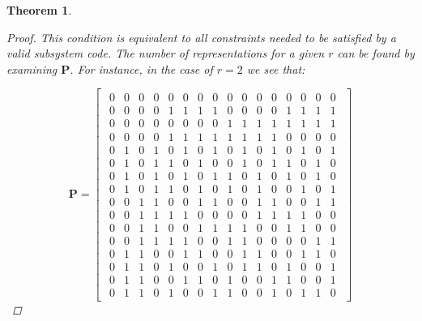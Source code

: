 \documentclass[conference]{IEEEtran}
\newtheorem{theorem}{Theorem}
\begin{document}
\begin{theorem}
\begin{proof}
   This condition is equivalent to all constraints needed to be satisfied by a valid subsystem code. The number of representations for a given $r$ can be found by examining $\boldsymbol{P}$. For instance, in the case of $r=2$ we see that:
       
  \begin{equation}\boldsymbol{P}=\begin{bmatrix}
  \begin{smallmatrix}
       0 & 0 & 0 & 0 & 0 & 0 & 0 & 0 & 0 & 0 & 0 & 0 & 0 & 0 & 0 & 0\\
       0 & 0 & 0 & 0 & 1 & 1 & 1 & 1 & 0 & 0 & 0 & 0 & 1 & 1 & 1 & 1\\
       0 & 0 & 0 & 0 & 0 & 0 & 0 & 0 & 1 & 1 & 1 & 1 & 1 & 1 & 1 & 1\\
       0 & 0 & 0 & 0 & 1 & 1 & 1 & 1 & 1 & 1 & 1 & 1 & 0 & 0 & 0 & 0\\
       0 & 1 & 0 & 1 & 0 & 1 & 0 & 1 & 0 & 1 & 0 & 1 & 0 & 1 & 0 & 1\\
       0 & 1 & 0 & 1 & 1 & 0 & 1 & 0 & 0 & 1 & 0 & 1 & 1 & 0 & 1 & 0\\
       0 & 1 & 0 & 1 & 0 & 1 & 0 & 1 & 1 & 0 & 1 & 0 & 1 & 0 & 1 & 0\\
       0 & 1 & 0 & 1 & 1 & 0 & 1 & 0 & 1 & 0 & 1 & 0 & 0 & 1 & 0 & 1\\
       0 & 0 & 1 & 1 & 0 & 0 & 1 & 1 & 0 & 0 & 1 & 1 & 0 & 0 & 1 & 1\\
       0 & 0 & 1 & 1 & 1 & 1 & 0 & 0 & 0 & 0 & 1 & 1 & 1 & 1 & 0 & 0\\
       0 & 0 & 1 & 1 & 0 & 0 & 1 & 1 & 1 & 1 & 0 & 0 & 1 & 1 & 0 & 0\\
       0 & 0 & 1 & 1 & 1 & 1 & 0 & 0 & 1 & 1 & 0 & 0 & 0 & 0 & 1 & 1\\
       0 & 1 & 1 & 0 & 0 & 1 & 1 & 0 & 0 & 1 & 1 & 0 & 0 & 1 & 1 & 0\\
       0 & 1 & 1 & 0 & 1 & 0 & 0 & 1 & 0 & 1 & 1 & 0 & 1 & 0 & 0 & 1\\
       0 & 1 & 1 & 0 & 0 & 1 & 1 & 0 & 1 & 0 & 0 & 1 & 1 & 0 & 0 & 1\\
       0 & 1 & 1 & 0 & 1 & 0 & 0 & 1 & 1 & 0 & 0 & 1 & 0 & 1 & 1 & 0   
   \end{smallmatrix}
   \end{bmatrix}\end{equation}

\end{proof}
\end{theorem}
\end{document}
